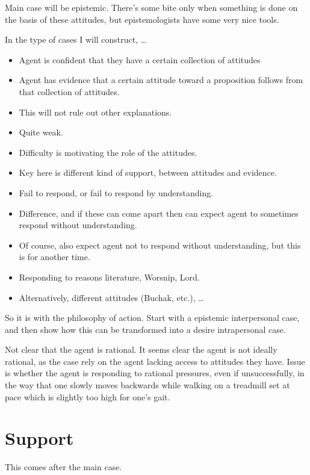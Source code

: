 \documentclass[10pt]{article}
\begin{document}
Main case will be epistemic.
There's some bite only when something is done on the basis of these attitudes, but epistemologists have some very nice tools.

In the type of cases I will construct, \dots
\begin{itemize}
\item Agent is confident that they have a certain collection of attitudes
\item Agent has evidence that a certain attitude toward a proposition follows from that collection of attitudes.
\item This will not rule out other explanations.
\item Quite weak.
\item Difficulty is motivating the role of the attitudes.
\item Key here is different kind of support, between attitudes and evidence.
\item Fail to respond, or fail to respond by understanding.
\item Difference, and if these can come apart then can expect agent to sometimes respond without understanding.
\item Of course, also expect agent not to respond without understanding, but this is for another time.
\item Responding to reasons literature, Worsnip, Lord.
\item Alternatively, different attitudes (Buchak, etc.), \dots
\end{itemize}

So it is with the philosophy of action.
Start with a epistemic interpersonal case, and then show how this can be transformed into a desire intrapersonal case.

Not clear that the agent is rational.
It seems clear the agent is not ideally rational, as the case rely on the agent lacking access to attitudes they have.
Issue is whether the agent is responding to rational pressures, even if unsuccessfully, in the way that one slowly moves backwards while walking on a treadmill set at pace which is slightly too high for one's gait.

\section{Support}
\label{sec:support}

\begin{note}
  This comes after the main case.
\end{note}
\end{document}
